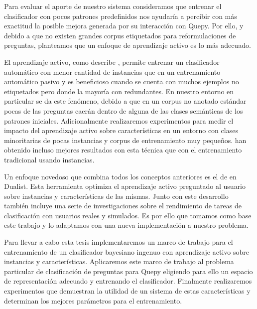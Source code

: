 Para evaluar el aporte de nuestro sistema consideramos que entrenar el clasificador con pocos patrones predefinidos nos ayudaría a percibir con más exactitud la posible mejora generada por su interacción con Quepy. Por ello, y debido a que no existen grandes corpus etiquetados para reformulaciones de preguntas, planteamos que un enfoque de aprendizaje activo es lo más adecuado.

El aprendizaje activo, como describe \citet{settles_active_learning_survey}, permite entrenar un clasificador automático con menor cantidad de instancias que en un entrenamiento automático pasivo y es beneficioso cuando se cuenta con muchos ejemplos no etiquetados pero donde la mayoría con redundantes. En nuestro entorno en particular se da este fenómeno, debido a que en un corpus no anotado estándar pocas de las preguntas caerán dentro de alguna de las clases semánticas de los patrones iniciales. Adicionalmente realizaremos experimentos para medir el impacto del aprendizaje activo sobre características en un entorno con clases minoritarias de pocas instancias y corpus de entrenamiento muy pequeños. \citet{settles-al-features} han obtenido incluso mejores resultados con esta técnica que con el entrenamiento tradicional usando instancias.

Un enfoque novedoso que combina todos los conceptos anteriores es el de \citet{dualist} en Dualist. Esta herramienta optimiza el aprendizaje activo preguntado al usuario sobre instancias y características de las mismas. Junto con este desarrollo también incluye una serie de investigaciones sobre el rendimiento de tareas de clasificación con usuarios reales y simulados. Es por ello que tomamos como base este trabajo y lo adaptamos con una nueva implementación a nuestro problema.

Para llevar a cabo esta tesis implementaremos un marco de trabajo para el entrenamiento de un clasificador bayesiano ingenuo con aprendizaje activo sobre instancias y características. Aplicaremos este marco de trabajo al problema particular de clasificación de preguntas para Quepy eligiendo para ello un espacio de representación adecuado y entrenando el clasificador. Finalmente realizaremos experimentos que demuestran la utilidad de un sistema de estas características y determinan los mejores parámetros para el entrenamiento.

